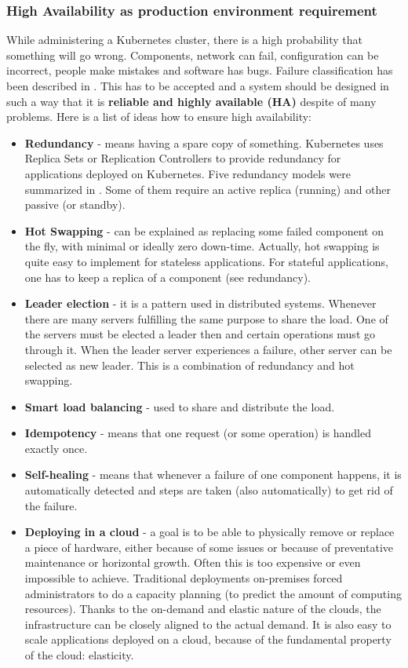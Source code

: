 \subsubsection{High Availability as production environment requirement}
While administering a Kubernetes cluster, there is a high probability that something will go wrong. Components, network can fail, configuration can be incorrect, people make mistakes and software has bugs. Failure classification has been described in \cite{article-failures}. This has to be accepted and a system should be designed in such a way that it is \textbf{reliable and highly available (HA)} despite of many problems. Here is a list of ideas how to ensure high availability\cite{book-mastering-k8s}:
\begin{itemize}
\item \textbf{Redundancy} - means having a spare copy of something. Kubernetes uses Replica Sets or Replication Controllers to provide redundancy for applications deployed on Kubernetes. Five redundancy models were summarized in \cite{article-redundancy-models}. Some of them require an active replica (running) and other passive (or standby).
\item \textbf{Hot Swapping} - can be explained as replacing some failed component on the fly, with minimal or ideally zero down-time. Actually, hot swapping is quite easy to implement for stateless applications. For stateful applications, one has to keep a replica of a component (see redundancy).
\item \textbf{Leader election} - it is a pattern used in distributed systems. Whenever there are many servers fulfilling the same purpose to share the load. One of the servers must be elected a leader then and certain operations must go through it. When the leader server experiences a failure, other server can be selected as new leader. This is a combination of redundancy and hot swapping.
\item \textbf{Smart load balancing} - used to share and distribute the load.
\item \textbf{Idempotency} - means that one request (or some operation) is handled exactly once.
\item \textbf{Self-healing} - means that whenever a failure of one component happens, it is automatically detected and steps are taken (also automatically) to get rid of the failure.
\item \textbf{Deploying in a cloud} - a goal is to be able to physically remove or replace a piece of hardware, either because of some issues or because of preventative maintenance or horizontal growth. Often this is too expensive or even impossible to achieve\cite{article-failures}. Traditional deployments on-premises forced administrators to do a capacity planning (to predict the amount of computing resources). Thanks to the on-demand and elastic nature of the clouds, the infrastructure can be closely aligned to the actual demand. It is also easy to scale applications deployed on a cloud, because of the fundamental property of the cloud: elasticity\cite{article-aws-architecting}.
\end{itemize}

